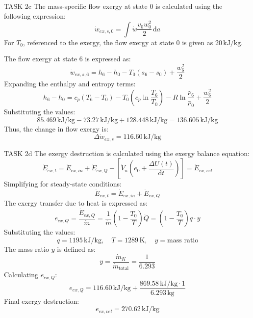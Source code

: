 TASK 2c  
The mass-specific flow exergy at state 0 is calculated using the following expression:  
\[
\dot{w}_{ex,s,0} = \int \dot{w} \frac{v_0 w_0^2}{2} \, \text{d}a
\]  
For \( T_0 \), referenced to the exergy, the flow exergy at state 0 is given as \( 20 \, \text{kJ/kg} \).  

The flow exergy at state 6 is expressed as:  
\[
\dot{w}_{ex,s,6} = h_6 - h_0 - T_0 (s_6 - s_0) + \frac{w_6^2}{2}
\]  
Expanding the enthalpy and entropy terms:  
\[
h_6 - h_0 = c_p (T_6 - T_0) - T_0 \left( c_p \ln \frac{T_6}{T_0} \right) - R \ln \frac{p_6}{p_0} + \frac{w_6^2}{2}
\]  
Substituting the values:  
\[
85.469 \, \text{kJ/kg} - 73.27 \, \text{kJ/kg} + 128.448 \, \text{kJ/kg} = 136.605 \, \text{kJ/kg}
\]  
Thus, the change in flow exergy is:  
\[
\Delta \dot{w}_{ex,s} = 116.60 \, \text{kJ/kg}
\]  

TASK 2d  
The exergy destruction is calculated using the exergy balance equation:  
\[
\dot{E}_{ex,t} = \dot{E}_{ex,in} + \dot{E}_{ex,Q} - \left[ \dot{V}_u \left( e_0 + \frac{\Delta U(t)}{\text{d}t} \right) \right] = \dot{E}_{ex,vel}
\]  
Simplifying for steady-state conditions:  
\[
\dot{E}_{ex,t} = \dot{E}_{ex,in} + \dot{E}_{ex,Q}
\]  
The exergy transfer due to heat is expressed as:  
\[
e_{ex,Q} = \frac{\dot{E}_{ex,Q}}{\dot{m}} = \frac{1}{\dot{m}} \left( 1 - \frac{T_0}{T} \right) \dot{Q} = \left( 1 - \frac{T_0}{T} \right) q \cdot y
\]  
Substituting the values:  
\[
q = 1195 \, \text{kJ/kg}, \quad T = 1289 \, \text{K}, \quad y = \text{mass ratio}
\]  
The mass ratio \( y \) is defined as:  
\[
y = \frac{\dot{m}_K}{\dot{m}_\text{total}} = \frac{1}{6.293}
\]  
Calculating \( e_{ex,Q} \):  
\[
e_{ex,Q} = 116.60 \, \text{kJ/kg} + \frac{869.58 \, \text{kJ/kg} \cdot 1}{6.293 \, \text{kg}}
\]  
Final exergy destruction:  
\[
e_{ex,vel} = 270.62 \, \text{kJ/kg}
\]